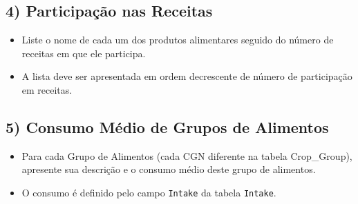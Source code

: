 \documentclass[11pt]{article}
\providecommand{\tightlist}{%
      \setlength{\itemsep}{0pt}\setlength{\parskip}{0pt}}
\begin{document}
    
    
    \hypertarget{participauxe7uxe3o-nas-receitas}{%
\subsection{4) Participação nas
Receitas}\label{participauxe7uxe3o-nas-receitas}}

\begin{itemize}
\tightlist
\item
  Liste o nome de cada um dos produtos alimentares seguido do número de
  receitas em que ele participa.
\item
  A lista deve ser apresentada em ordem decrescente de número de
  participação em receitas.
\end{itemize}

    \hypertarget{consumo-muxe9dio-de-grupos-de-alimentos}{%
\subsection{5) Consumo Médio de Grupos de
Alimentos}\label{consumo-muxe9dio-de-grupos-de-alimentos}}

\begin{itemize}
\tightlist
\item
  Para cada Grupo de Alimentos (cada CGN diferente na tabela
  Crop\_Group), apresente sua descrição e o consumo médio deste grupo de
  alimentos.
\item
  O consumo é definido pelo campo \texttt{Intake} da tabela
  \texttt{Intake}.
\end{itemize}


    
    
    
    
\end{document}
